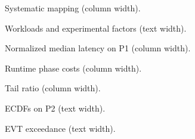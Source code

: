 \documentclass[10pt]{article}
\newlength{\colw}\setlength{\colw}{3.375in}
\begin{document}
\newcommand{\colfig}[2]{\begin{figure}[p]\centering\begin{minipage}{\colw}\centering\end{minipage}\caption{#2}\end{figure}}
\newcommand{\widefig}[2]{\begin{figure}[p]\centering\begin{minipage}{\textwidth}\centering\end{minipage}\caption{#2}\end{figure}}
\colfig{fig1_msl}{Systematic mapping (column width).}
\widefig{fig2_method}{Workloads and experimental factors (text width).}
\colfig{fig3_perf_heatmap}{Normalized median latency on P1 (column width).}
\colfig{fig4_overhead}{Runtime phase costs (column width).}
\colfig{fig5_tail}{Tail ratio (column width).}
\widefig{fig6_ecdf}{ECDFs on P2 (text width).}
\widefig{fig7_evt}{EVT exceedance (text width).}
\end{document}
